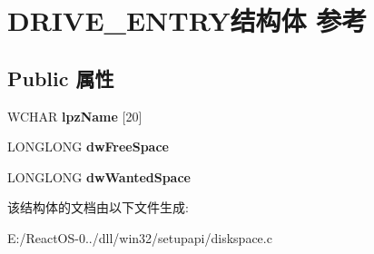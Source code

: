 \hypertarget{struct_d_r_i_v_e___e_n_t_r_y}{}\section{D\+R\+I\+V\+E\+\_\+\+E\+N\+T\+R\+Y结构体 参考}
\label{struct_d_r_i_v_e___e_n_t_r_y}
\subsection*{Public 属性}
\begin{DoxyCompactItemize}
\item 
\mbox{\label{struct_d_r_i_v_e___e_n_t_r_y_aafb8e6535a3010ad49d77ea5d553b384}} 
W\+C\+H\+AR {\bfseries lpz\+Name} \mbox{[}20\mbox{]}
\item 
\mbox{\label{struct_d_r_i_v_e___e_n_t_r_y_a2db97fcdf11dab5490e7180b28843944}} 
L\+O\+N\+G\+L\+O\+NG {\bfseries dw\+Free\+Space}
\item 
\mbox{\label{struct_d_r_i_v_e___e_n_t_r_y_a6e365e2c0e8da7d2b1affeddb6c8fcd1}} 
L\+O\+N\+G\+L\+O\+NG {\bfseries dw\+Wanted\+Space}
\end{DoxyCompactItemize}


该结构体的文档由以下文件生成\+:\begin{DoxyCompactItemize}
\item 
E\+:/\+React\+O\+S-\/0../dll/win32/setupapi/diskspace.\+c\end{DoxyCompactItemize}
